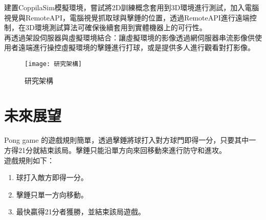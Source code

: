 建置CoppilaSim模擬環境，嘗試將2D訓練概念套用到3D環境進行測試，加入電腦視覺與RemoteAPI，電腦視覺抓取球與擊錘的位置，透過RemoteAPI進行遠端控制，在3D環境測試算法可確保後續套用到實體機器上的可行性。\\
 
 再透過架設伺服器與虛擬環境結合：讓虛擬環境的影像透過網伺服器串流影像供使用者遠端進行操控虛擬環境的擊錘進行打球，或是提供多人進行觀看對打影像。
\begin{figure}[hbt!]
\begin{center}
\texttt{[image: 研究架構]}
\caption{\Large 研究架構 }
\label{研究架構 }
\end{center}
\end{figure}


\section{未來展望}
 Pong game 的遊戲規則簡單，透過擊錘將球打入對方球門即得一分，只要其中一方得21分就結束該局。擊錘只能沿單方向來回移動來進行防守和進攻。\\
遊戲規則如下：
\begin{enumerate}
\item 球打入敵方即得一分。
\item 擊錘只單一方向移動。
\item 最快贏得21分者獲勝，並結束該局遊戲。
\end{enumerate}

\renewcommand{\baselinestretch}{0.5} %
